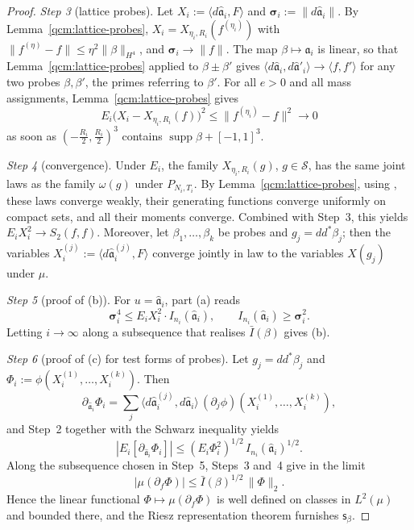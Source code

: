 \documentclass[11pt,letterpaper,reqno]{amsart}
\theoremstyle{definition}
\begin{document}
\begin{proof}
\emph{Step 3} (lattice probes).
Let $X_i:=\langle d\hat{\mathfrak a}_i,F\rangle$ and $\boldsymbol\sigma_i:=\|d\hat{\mathfrak a}_i\|$.
By Lemma~\ref{qcm:lattice-probes}, $X_i=X_{\eta_i,R_i}(f^{(\eta_i)})$ with $\|f^{(\eta)}-f\|\le\eta^2\|\beta\|_{H^4}$, and $\boldsymbol\sigma_i\to\|f\|$.
The map $\beta\mapsto\hat{\mathfrak a}_i$ is linear, so that Lemma~\ref{qcm:lattice-probes} applied to $\beta\pm\beta'$ gives $\langle d\hat{\mathfrak a}_i,\allowbreak d\hat{\mathfrak a}'_i\rangle\to\langle f,\allowbreak f'\rangle$ for any two probes $\beta,\beta'$, the primes referring to $\beta'$.
For all $e>0$ and all mass assignments, Lemma~\ref{qcm:lattice-probes} gives
\begin{equation*}
E_i\bigl(X_i-X_{\eta_i,R_i}(f)\bigr)^2\le\|f^{(\eta_i)}-f\|^2\to0
\end{equation*}
as soon as $(-\frac{R_i}2,\frac{R_i}2)^3$ contains $\operatorname{supp}\beta+[-1,1]^3$.

\emph{Step 4} (convergence).
Under $E_i$, the family $X_{\eta_i,R_i}(g)$, $g\in\mathcal S$, has the same joint laws as the family $\omega(g)$ under $P_{N_i,T_i}$.
By Lemma~\ref{qcm:lattice-probes}, using \cite[Section~6.2]{QEDConstruction}, these laws converge weakly, their generating functions converge uniformly on compact sets, and all their moments converge.
Combined with Step~3, this yields $E_iX_i^2\to S_2(f,f)$.
Moreover, let $\beta_1,\dots,\beta_k$ be probes and $g_j=dd^*\beta_j$; then the variables $X_i^{(j)}:=\langle d\hat{\mathfrak a}_i^{(j)},F\rangle$ converge jointly in law to the variables $X(g_j)$ under $\mu$.

\emph{Step 5} (proof of (b)).
For $u=\hat{\mathfrak a}_i$, part (a) reads
\begin{equation*}
\boldsymbol\sigma_i^4\le E_iX_i^2\cdot I_{n_i}(\hat{\mathfrak a}_i),\qquad I_{n_i}(\hat{\mathfrak a}_i)\ge\boldsymbol\sigma_i^2.
\end{equation*}
Letting $i\to\infty$ along a subsequence that realises $\bar I(\beta)$ gives (b).

\emph{Step 6} (proof of (c) for test forms of probes).
Let $g_j=dd^*\beta_j$ and $\Phi_i:=\phi(X_i^{(1)},\dots,X_i^{(k)})$.
Then
\begin{equation*}
\partial_{\hat{\mathfrak a}_i}\Phi_i=\sum_j\langle d\hat{\mathfrak a}_i^{(j)},d\hat{\mathfrak a}_i\rangle\,(\partial_j\phi)(X_i^{(1)},\dots,X_i^{(k)}),
\end{equation*}
and Step~2 together with the Schwarz inequality yields
\begin{equation*}
|E_i[\partial_{\hat{\mathfrak a}_i}\Phi_i]|\le(E_i\Phi_i^2)^{1/2}\,I_{n_i}(\hat{\mathfrak a}_i)^{1/2}.
\end{equation*}
Along the subsequence chosen in Step~5, Steps~3 and~4 give in the limit
\begin{equation*}
|\mu(\partial_f\Phi)|\le\bar I(\beta)^{1/2}\,\|\Phi\|_2.
\end{equation*}
Hence the linear functional $\Phi\mapsto\mu(\partial_f\Phi)$ is well defined on classes in $L^2(\mu)$ and bounded there, and the Riesz representation theorem furnishes $\mathsf s_\beta$.


\end{proof}
\end{document}
